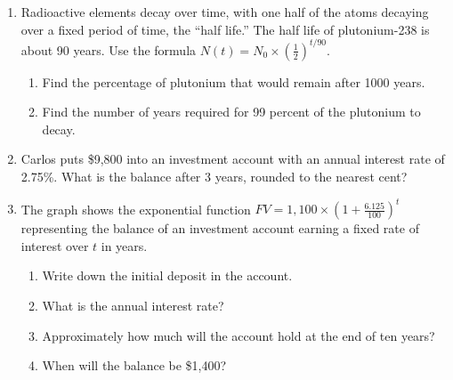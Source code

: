 \documentclass[12pt, twoside]{article}
\begin{document}
\begin{enumerate}
\begin{multicols}{2}
\begin{center}
    \end{center}
    \end{multicols}

\newpage
\item Radioactive elements decay over time, with one half of the atoms decaying over a fixed period of time, the ``half life.'' The half life of plutonium-238 is about 90 years. Use the formula $\displaystyle N(t)=N_0 \times \left( \frac{1}{2} \right)^{t/90}$. 
\begin{enumerate}[itemsep=1.5cm]
    \item Find the percentage of plutonium that would remain after 1000 years.
    \item Find the number of years required for 99 percent of the plutonium to decay.
\end{enumerate}


\item Carlos puts \$9,800 into an investment account with an annual interest rate of 2.75\%. What is the balance after 3 years, rounded to the nearest cent? \vspace{2cm}

\item The graph shows the exponential function $\displaystyle FV=1,100 \times \left( 1+\frac{6.125}{100} \right)^t$ representing the balance of an investment account earning a fixed rate of interest over $t$ in years.
\begin{multicols}{2}
    \begin{enumerate}[itemsep=1cm]
        \item Write down the initial deposit in the account.
        \item What is the annual interest rate?
        \item Approximately how much will the account hold at the end of ten years?
        \item When will the balance be \$1,400?
    \end{enumerate}
    \begin{center}
    \end{center}
    \end{multicols}

\end{enumerate}
\end{document}
